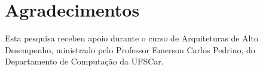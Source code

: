 \documentclass[twocolumn]{NobArticle}
\title{}
\author{
    Lucas Arruk Mendes\textsuperscript{1}
}
\date{
    \textsuperscript{\textbf{1}}
    RA:819446, Departamento de Computação, Universidade Federal de São Carlos\\
}
\begin{document}
\small
\maketitle








\section*{Agradecimentos}
Esta pesquisa recebeu apoio durante o curso de Arquiteturas de Alto Desempenho, ministrado pelo Professor Emerson Carlos Pedrino, do Departamento de Computação da UFSCar.

\printbibliography

\clearpage
\end{document}
